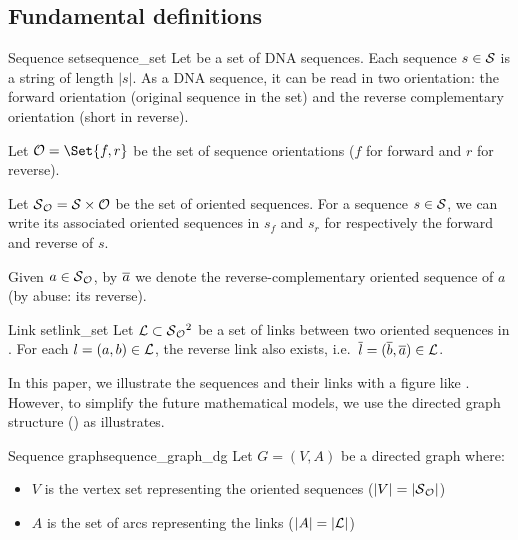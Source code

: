 \subsection{Fundamental definitions}

\begin{definition}{Sequence set}{sequence_set}
  Let \Sequences{} be a set of DNA sequences.
  Each sequence \(s \in \mathcal{S}{}\) is a string of length \(|s|\).
  As a DNA sequence, it can be read in two orientation:
  the forward orientation (original sequence in the set) and the reverse complementary orientation (short in reverse).

  Let \( \Orientations{} = \Set{f, r} \) be the set of sequence orientations (\(f\) for forward and \(r\) for reverse).

  Let \( \mathcal{S}{}_{\mathcal{O}{}}{} = \mathcal{S}{} \times \mathcal{O}{} \) be the set of oriented sequences.
  For a sequence \(s \in \mathcal{S}{}\), we can write its associated oriented sequences in \OrSeqs{} \(s_f\) and \(s_r\) for respectively the forward and reverse of \(s\).

  Given \(a \in \mathcal{S}{}_{\mathcal{O}{}}{}\), by \(\overline{a}\) we denote the reverse-complementary oriented sequence of \(a\) (by abuse: its reverse).
\end{definition}

\begin{definition}{Link set}{link_set}
  Let \(\mathcal{L}{} \subset \mathcal{S}{}_{\mathcal{O}{}}{}^2\) be a set of links between two oriented sequences in \OrSeqs{}.
  For each \(l = (a, b) \in \mathcal{L}{}\), the reverse link also exists, i.e.\ \(\overline{l} = (\overline{b}, \overline{a}) \in \mathcal{L}{} \). %
\end{definition}

In this paper, we illustrate the sequences and their links with a figure like .
However, to simplify the future mathematical models, we use the directed graph structure () as  illustrates.

\begin{definition}{Sequence graph}{sequence_graph_dg}
  Let \(G = (V, A)\) be a directed graph where:

  \begin{itemize}
    \item \(V\) is the vertex set representing the oriented sequences (\(|V| = |\mathcal{S}{}_{\mathcal{O}{}}|\))
    \item \(A\) is the set of arcs representing the links (\(|A| = |\mathcal{L}|\))
  \end{itemize}
\end{definition}

